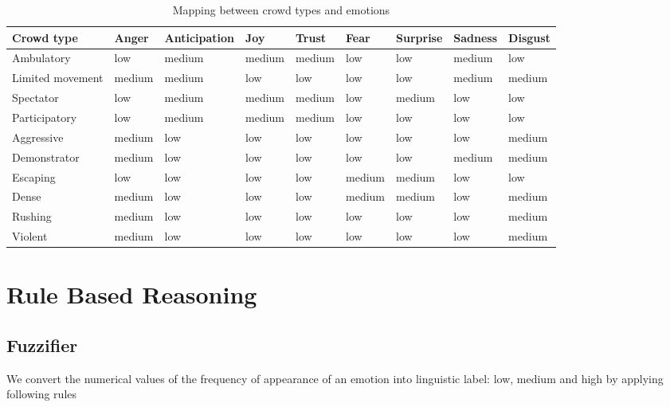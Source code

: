 \begin{table}
\caption{Mapping between crowd types and emotions}
\label{table:mappingEmotionCrowdType}
\begin{tabular}{|p{2cm}|p{1.2cm}|p{1.2cm}|p{1.2cm}|p{1.2cm}|p{1.2cm}|p{1.2cm}|p{1.2cm}|p{1.2cm}|}
\hline
\textbf{Crowd type}	& \textbf{Anger}	& \textbf{Anticipation}	& \textbf{Joy} 	& \textbf{Trust}	& \textbf{Fear}	& \textbf{Surprise}	& \textbf{Sadness}	& \textbf{Disgust}	\\
\hline
Ambulatory			& low 				& medium				& medium		& medium			& low 			& low 				& medium			& low 		\\
\hline
Limited movement	& medium			& medium				& low 			& low 				& low 			& low 				& medium			& medium	\\
\hline
Spectator			& low 				& medium				& medium		& medium 			& low 			& medium			& low 				& low 		\\
\hline
Participatory		& low 				& medium				& medium		& medium			& low 			& low 				& low 				& low 		\\
\hline
Aggressive			& medium			& low 					& low 			& low 				& low 			& low 				& low 				& medium	\\
\hline
Demonstrator		& medium			& low 					& low 			& low 				& low 			& low 				& medium			& medium	\\
\hline
Escaping			& low 				& low 					& low 			& low 				& medium		& medium			& low 				& low 		\\
\hline
Dense				& medium			& low 					& low 			& low 				& medium		& medium			& low 				& medium	\\
\hline
Rushing				& medium			& low 					& low 			& low 				& low 			& low 				& low 				& medium	\\
\hline
Violent				& medium			& low 					& low 			& low 				& low 			& low 				& low 				& medium	\\
\hline
\end{tabular}
\end{table}

\section{Rule Based Reasoning}

\subsection{Fuzzifier}
We convert the numerical values of the frequency of appearance of an emotion into linguistic label: low, medium and high by applying following rules

